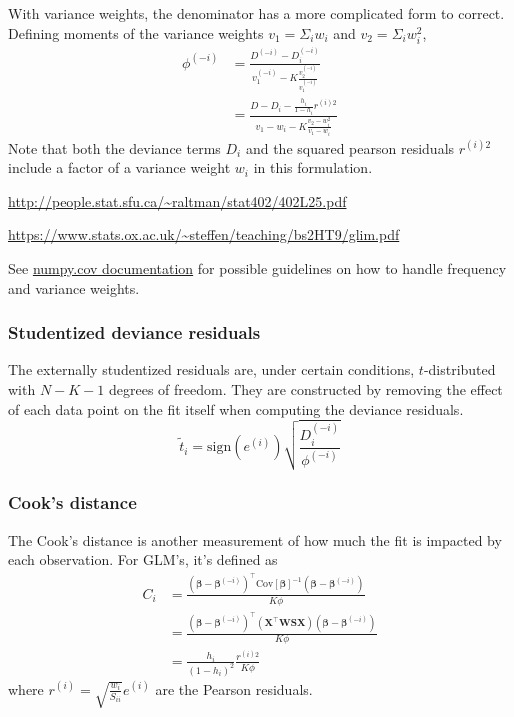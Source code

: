 \documentclass{article}
\begin{document}
With variance weights, the denominator has a more complicated form to correct.
Defining moments of the variance weights $v_1 = \Sigma_i w_i$ and $v_2 = \Sigma_i w_i^2$,
\begin{align}
  \phi^{(-i)} &= \frac{D^{(-i)} - D_i^{(-i)}}{v_1^{(-i)} - K \frac{v_2^{(-i)}}{v_1^{(-i)}}} \\
              &= \frac{D - D_i - \frac{h_i}{1-h_i} r^{(i)2} }{v_1 - w_i - K \frac{v_2 - w_i^2}{v_1 - w_i}}
\end{align}
Note that both the deviance terms $D_i$ and the squared pearson residuals
$r^{(i)2}$ include a factor of a variance weight $w_i$ in this formulation.

\url{http://people.stat.sfu.ca/~raltman/stat402/402L25.pdf}

\url{https://www.stats.ox.ac.uk/~steffen/teaching/bs2HT9/glim.pdf}

See
\href{https://numpy.org/doc/stable/reference/generated/numpy.cov.html#numpy.cov}{numpy.cov
documentation} for possible guidelines on how to handle frequency and variance
weights.

\subsubsection{Studentized deviance residuals}
The externally studentized residuals are, under certain conditions,
$t$-distributed with $N-K-1$ degrees of freedom. They are constructed by
removing the effect of each data point on the fit itself when computing the
deviance residuals.
\[\tilde{t}_i = \mathrm{sign}(e^{(i)}) \sqrt{\frac{D_i^{(-i)}}{\phi^{(-i)}}} \]

\subsubsection{Cook's distance}
The Cook's distance is another measurement of how much the fit is impacted by
each observation. For GLM's, it's defined as
\begin{align}
  C_i &= \frac{\left(\boldsymbol{\beta} - \boldsymbol{\beta}^{(-i)}\right)^\intercal \mathrm{Cov}[\boldsymbol{\beta}]^{-1} \left( \boldsymbol{\beta} - \boldsymbol{\beta}^{(-i)}\right)}{K \phi} \\
      &= \frac{\left(\boldsymbol{\beta} - \boldsymbol{\beta}^{(-i)}\right)^\intercal \left(\mathbf{X}^\intercal \mathbf{W} \mathbf{S} \mathbf{X}\right) \left( \boldsymbol{\beta} - \boldsymbol{\beta}^{(-i)}\right)}{K \phi} \\
      &= \frac{h_i}{(1-h_i)^2} \frac{r^{(i)2}}{K\phi}
\end{align}
where \(r^{(i)} = \sqrt{\frac{w_i}{S_{ii}}}e^{(i)}\) are the Pearson residuals.
\end{document}
